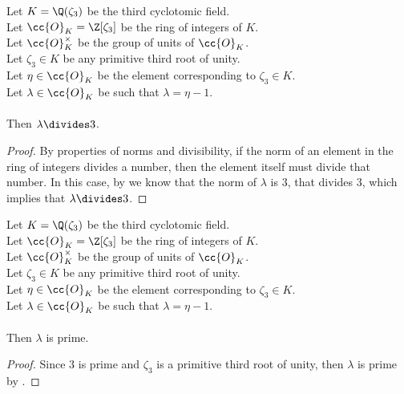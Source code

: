 \begin{lemma}
    \label{lmm:lambda_dvd_three}
    \leanok
    Let $K = \Q(\zeta_3)$ be the third cyclotomic field. \\
    Let $\cc{O}_K = \Z[\zeta_3]$ be the ring of integers of $K$. \\
    Let $\cc{O}^\times_K$ be the group of units of $\cc{O}_K$. \\
    Let $\zeta_3 \in K$ be any primitive third root of unity. \\
    Let $\eta \in \cc{O}_K$ be the element corresponding to $\zeta_3 \in K$. \\
    Let $\lambda \in \cc{O}_K$ be such that $\lambda = \eta -1$. \\\\
    Then $\lambda \divides 3$.
\end{lemma}
\begin{proof}
    \leanok
    By properties of norms and divisibility, if the norm of an element in the ring of integers
    divides a number, then the element itself must divide that number.
    In this case, by  we know that the norm of $\lambda$ is $3$, that divides $3$,
    which implies that $\lambda \divides 3$.
\end{proof}

\begin{lemma}
    \label{lmm:lambda_prime}
    \leanok
    Let $K = \Q(\zeta_3)$ be the third cyclotomic field. \\
    Let $\cc{O}_K = \Z[\zeta_3]$ be the ring of integers of $K$. \\
    Let $\cc{O}^\times_K$ be the group of units of $\cc{O}_K$. \\
    Let $\zeta_3 \in K$ be any primitive third root of unity. \\
    Let $\eta \in \cc{O}_K$ be the element corresponding to $\zeta_3 \in K$. \\
    Let $\lambda \in \cc{O}_K$ be such that $\lambda = \eta -1$. \\\\
    Then $\lambda$ is prime.
\end{lemma}
\begin{proof}
    \leanok
    Since $3$ is prime and $\zeta_3$ is a primitive third root of unity, then $\lambda$ is prime
    by .
\end{proof}


